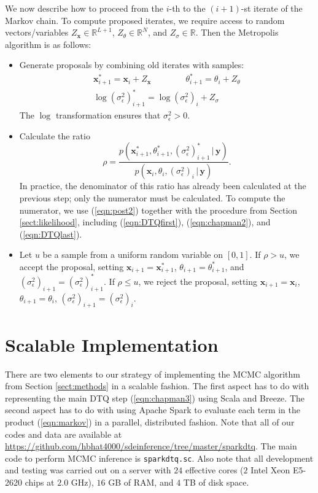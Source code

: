 \documentclass[wcp]{jmlr}
\begin{document}
We now describe how to proceed from the $i$-th to the
$(i+1)$-st iterate of the Markov chain.  To compute proposed iterates,
we require access to random vectors/variables $Z_\mathbf{x} \in \mathbb{R}^{L+1}$,
$Z_\theta \in \mathbb{R}^N$, and $Z_\sigma \in \mathbb{R}$.  Then the
Metropolis algorithm is as follows:
\begin{itemize}
\item Generate proposals by combining old iterates with samples:
\begin{gather*}
\mathbf{x}^\ast_{i+1} = \mathbf{x}_i + Z_{\mathbf{x}} \qquad \qquad
\theta^\ast_{i+1} = \theta_i + Z_\theta \\
\log (\sigma_\epsilon^2)^\ast_{i+1} = \log (\sigma_\epsilon^2)_i + Z_\sigma
\end{gather*}
The $\log$ transformation ensures that 
$\sigma_\epsilon^2 > 0$.
\item Calculate the ratio
\begin{equation}
\label{eqn:rho}
\rho = \frac{ p( \mathbf{x}^\ast_{i+1}, \theta^\ast_{i+1},
  (\sigma_\epsilon^2)^\ast_{i+1} \, | \, \mathbf{y} ) } { p(
  \mathbf{x}_{i}, \theta_{i}, (\sigma_\epsilon^2)_{i} \, | \,
  \mathbf{y} )  }.
\end{equation}
In practice, the denominator of this ratio has already been calculated at the
previous step; only the numerator must be calculated.  To
compute the numerator, we use (\ref{eqn:post2}) together with the
procedure from Section \ref{sect:likelihood}, including
(\ref{eqn:DTQfirst}), (\ref{eqn:chapman2}), and (\ref{eqn:DTQlast}).
\item Let $u$ be a sample from a uniform random variable on $[0,1]$.
  If $\rho > u$, we accept the proposal, setting $\mathbf{x}_{i+1} =
  \mathbf{x}^\ast_{i+1}$, $\theta_{i+1} = \theta_{i+1}^\ast$, and
  $(\sigma_\epsilon^2)_{i+1} = (\sigma_\epsilon^2)^\ast_{i+1}$.  If
  $\rho \leq u$, we reject the proposal, setting $\mathbf{x}_{i+1} =
  \mathbf{x}_i$, $\theta_{i+1} = \theta_i$, $(\sigma_\epsilon^2)_{i+1} = (\sigma_\epsilon^2)_{i}$.
\end{itemize}

\section{Scalable Implementation}
\label{sect:scalableimplementation}

There are two elements to our strategy of implementing the MCMC
algorithm from Section \ref{sect:methods} in a scalable fashion.  The
first aspect has to do with representing the main DTQ step
(\ref{eqn:chapman3}) using Scala and Breeze.  The second aspect has to
do with using Apache Spark to evaluate each term in the product
(\ref{eqn:markov}) in a parallel, distributed fashion.  Note that all
of our codes and data are available at
\url{https://github.com/hbhat4000/sdeinference/tree/master/sparkdtq}.
The main code to perform MCMC inference is \texttt{sparkdtq.sc}.  Also
note that all development and testing was carried out on a server with
$24$ effective cores ($2$ Intel Xeon E5-2620 chips at $2.0$ GHz), $16$
GB of RAM, and $4$ TB of disk space.
\end{document}
